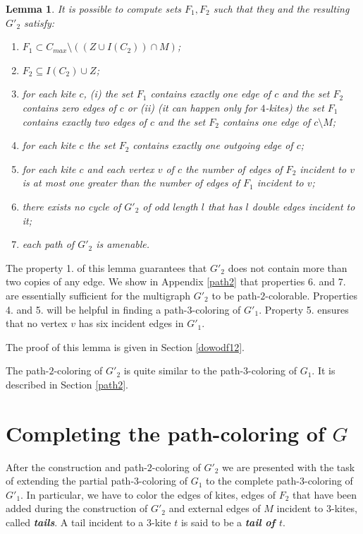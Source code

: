 \documentclass[a4, 11pt]{article}
\newcommand{\<}{\langle}
\renewcommand{\>}{\rangle}
\newtheorem{lemma}{Lemma}
\begin{document}
\begin{lemma}\label{F12}
It is possible to compute sets  $F_1, F_2$   such that they and  the resulting $G'_2$ satisfy:
\begin{enumerate}
\item $F_1 \subset C_{max} \setminus ((Z \cup I(C_2))\cap M)$;
\item $F_2 \subseteq I(C_2) \cup Z$;
\item for each kite $c$, (i) the set $F_1$ contains exactly one edge of $c$ and the set $F_2$ contains zero edges of $c$ or (ii) (it can happen only for $4$-kites) the set $F_1$ contains exactly two edges of $c$ and the set $F_2$ contains one edge of $c \setminus M$;
\item for each kite $c$ the set $F_2$ contains exactly one outgoing edge of $c$;
\item for each kite $c$ and each vertex $v$ of $c$ the number of edges of $F_2$ incident to $v$ is at most one greater than the number of edges of $F_1$ incident to $v$;
\item there exists no cycle of $G'_2$ of odd length $l$ that has $l$ double edges incident to it;
\item each path of $G'_2$ is amenable.

\end{enumerate}
\end{lemma}

The property 1. of this lemma guarantees that $G'_2$ does not contain more than two copies of any edge. We  show in Appendix \ref{path2} that properties 6. and 7. are essentially sufficient for the multigraph $G'_2$ to be path-$2$-colorable. Properties  4. and 5. will be helpful
in finding a path-$3$-coloring of $G'_1$. Property 5. ensures that no vertex $v$ has six incident edges in $G'_1$. 

The proof of this lemma is given in Section \ref{dowodf12}.

The path-$2$-coloring of $G'_2$ is quite similar to the path-$3$-coloring of $G_1$. It is described in Section \ref{path2}.

\section{Completing the path-coloring of $G$}
After the construction and path-$2$-coloring of $G'_2$ we are presented with the task of extending the partial path-$3$-coloring of $G_1$ to the complete path-$3$-coloring of $G'_1$. In particular, we have to color the  edges
of kites, edges of $F_2$ that have been added during the construction of $G'_2$ and external edges of $M$ incident to $3$-kites, called {\bf \em tails}. A tail incident to a $3$-kite $t$ is said to be a {\bf \em tail of $t$}.
\end{document}
